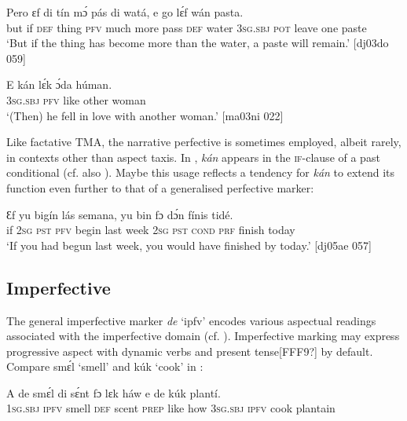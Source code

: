 \ea%
    \label{ex:key:326}
    \gll Pero    ɛf  di  tín       mɔ́    pás  di  watá,
e    go  lɛ́f    wán    pasta.\\
but    if  \textsc{def}  thing  \textsc{pfv}  much  more  pass  \textsc{def}  water
\textsc{3sg.sbj}  \textsc{pot}  leave  one    paste\\

\glt ‘But if the thing has become more than the water, a paste will remain.’ [dj03do 059]
\z


\ea%
    \label{ex:key:327}
    \gll E    kán  lɛ́k  ɔ́da    húman.\\
\textsc{3sg.sbj}  \textsc{pfv}  like  other  woman\\

\glt ‘(Then) he fell in love with another woman.’ [ma03ni 022]
\z

Like factative TMA, the narrative perfective is sometimes employed, albeit rarely, in contexts other than aspect taxis. In , \textit{kán} appears in the \textsc{if-}clause of a past conditional (cf. also ). Maybe this usage reflects a tendency for \textit{kán} to extend its function even further to that of a generalised perfective marker: 


\ea%
    \label{ex:key:328}
    \gll Ɛf  yu     bigín  lás  semana,  yu  bin  fɔ    dɔ́n  fínis    tidé.\\
if  \textsc{2sg}  \textsc{pst}  \textsc{pfv}  begin  last  week  \textsc{2sg}  \textsc{pst}  \textsc{cond}    \textsc{prf}  finish  today\\

\glt ‘If you had begun last week, you would have finished by today.’ [dj05ae 057]
\z

\subsection{Imperfective}\label{sec:6.3.4}

The general imperfective marker \textit{de} ‘ipfv’ encodes various aspectual readings associated with the imperfective domain (cf. ). Imperfective marking may express progressive aspect with dynamic verbs and present tense[FFF9?] by default. Compare smɛ́l ‘smell’ and kúk ‘cook’ in : 


\ea%
    \label{ex:key:329}
    \gll A    de  smɛ́l  di  sɛ́nt    fɔ  lɛk  háw    e    de  kúk    plantí.\\
\textsc{1sg.sbj}  \textsc{ipfv}  smell  \textsc{def}  scent  \textsc{prep}  like  how    \textsc{3sg.sbj}  \textsc{ipfv}  cook  plantain\\

